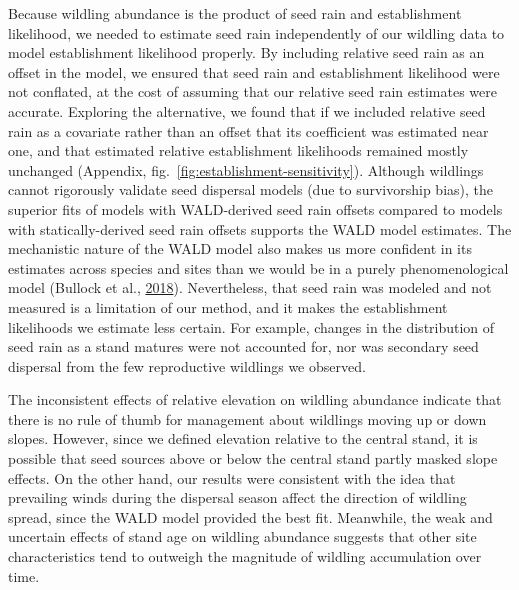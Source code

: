 \documentclass[
]{article}
\begin{document}
Because wildling abundance is the product of seed rain and establishment likelihood, we needed to estimate seed rain independently of our wildling data to model establishment likelihood properly.
By including relative seed rain as an offset in the model, we ensured that seed rain and establishment likelihood were not conflated, at the cost of assuming that our relative seed rain estimates were accurate.
Exploring the alternative, we found that if we included relative seed rain as a covariate rather than an offset that its coefficient was estimated near one, and that estimated relative establishment likelihoods remained mostly unchanged (Appendix, fig.~\ref{fig:establishment-sensitivity}).
Although wildlings cannot rigorously validate seed dispersal models (due to survivorship bias), the superior fits of models with WALD-derived seed rain offsets compared to models with statically-derived seed rain offsets supports the WALD model estimates.
The mechanistic nature of the WALD model also makes us more confident in its estimates across species and sites than we would be in a purely phenomenological model (Bullock et al., \protect\hyperlink{ref-bullockAllDispersalFunctions2018}{2018}).
Nevertheless, that seed rain was modeled and not measured is a limitation of our method, and it makes the establishment likelihoods we estimate less certain.
For example, changes in the distribution of seed rain as a stand matures were not accounted for, nor was secondary seed dispersal from the few reproductive wildlings we observed.

The inconsistent effects of relative elevation on wildling abundance indicate that there is no rule of thumb for management about wildlings moving up or down slopes.
However, since we defined elevation relative to the central stand, it is possible that seed sources above or below the central stand partly masked slope effects.
On the other hand, our results were consistent with the idea that prevailing winds during the dispersal season affect the direction of wildling spread, since the WALD model provided the best fit.
Meanwhile, the weak and uncertain effects of stand age on wildling abundance suggests that other site characteristics tend to outweigh the magnitude of wildling accumulation over time.
\end{document}
